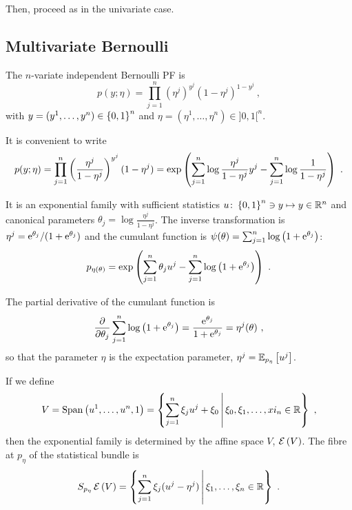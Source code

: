 \documentclass[12pt,a4paper]{amsart}
\begin{document}
Then, proceed as in the univariate case.

\subsection{Multivariate Bernoulli}
\label{sec:mult-binom}

The $n$-variate independent Bernoulli PF is 
\begin{equation}
    p(y;\eta) = \prod_{j=1}^n (\eta^j)^{y^j}(1-\eta^j)^{1-y^j} \ , 
\end{equation}
with $y = (y^1,\dots,y^n) \in \left\{0,1\right\}^n$ and $\eta = (\eta^1,\dots,\eta^n) \in ]0,1[^n$.

It is convenient to write
\begin{equation}
  \label{eq:exponential-family}
    p(y;\eta) = \prod_{j=1}^n \left(\frac{\eta^j}{1-\eta^j}\right)^{y^j} (1 - \eta^j) = \exp\left(\sum_{j=1}^n \log \frac{\eta^j}{1-\eta^j} y^j - \sum_{j=1}^n \log \frac 1 {1 - \eta^j}\right) \ .
  \end{equation}

  It is an exponential family with sufficient statistics $u \colon \left\{0,1\right\}^n \ni y \mapsto y \in \mathbb{R}^n$ and canonical parameters $\theta_j = \log \frac{\eta^j}{1-\eta^j}$. The inverse transformation is $\eta^j = \mathrm{e}^{\theta_j}/(1+\mathrm{e}^{\theta_j})$ and the cumulant function is $\psi(\theta) = \sum_{j=1}^n \log \left(1 + \mathrm{e}^{\theta_j}\right)$:
      \begin{equation}
        \label{eq:21}
        p_{\eta(\theta)} = \exp\left(\sum_{j=1}^n \theta_j u^j - \sum_{j=1}^n \log \left(1 + \mathrm{e}^{\theta_j}\right)\right) \ .
      \end{equation}

 The partial derivative of the cumulant function is
      \begin{equation}
        \label{eq:26}
        \frac {\partial} {\partial \theta_j} \sum_{j=1}^n \log \left(1 + \mathrm{e}^{\theta_j}\right) = \frac{\mathrm{e}^{\theta_j}}{1 + \mathrm{e}^{\theta_j}} = \eta^j(\theta) \ , \end{equation}
      so that the parameter $\eta$ is the expectation parameter, $\eta^j = \operatorname{\mathbb E}_{p_\eta}\left[u^j\right]$.

If we define
\begin{equation}
  \label{eq:27}
  V = \operatorname{Span}\left(u^1,\dots,u^n,1\right) = \left\{\sum_{j=1}^n \xi_j u^j + \xi_0 \, \middle| \, \xi_0,\xi_1, \dots,xi_n \in \mathbb{R} \right\} \ ,
\end{equation}
then the exponential family is determined by the affine space $V$, $\operatorname{\mathcal E}\left(V\right)$. The fibre at $p_\eta$ of the statistical bundle is
\begin{equation}
  \label{eq:28}
  S_{p_\eta}\operatorname{\mathcal E}\left(V\right) = \left\{\sum_{j=1}^n \xi_j(u^j - \eta^j) \, \middle| \, \xi_1,\dots,\xi_n \in \mathbb{R} \right\} \ .
\end{equation}
\end{document}
